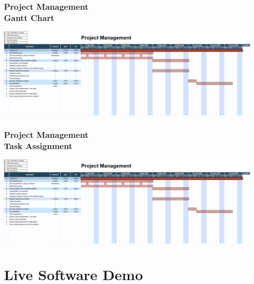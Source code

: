 \documentclass[ucs,10pt]{beamer}
\begin{document}
\begin{frame}
\frametitle{Project Management \\
    \small \color{rwth-blue} Gantt Chart}
    
    \begin{center}
        \includegraphics[width=\textwidth]{figures/project management.png}
    \end{center}
\end{frame}

\begin{frame}
\frametitle{Project Management \\
    \small \color{rwth-blue} Task Assignment}
    
    \begin{flushleft}
        \includegraphics[height=\textheight,keepaspectratio]{figures/project management.png}
    \end{flushleft}
\end{frame}



\section{Live Software Demo}
\end{document}
